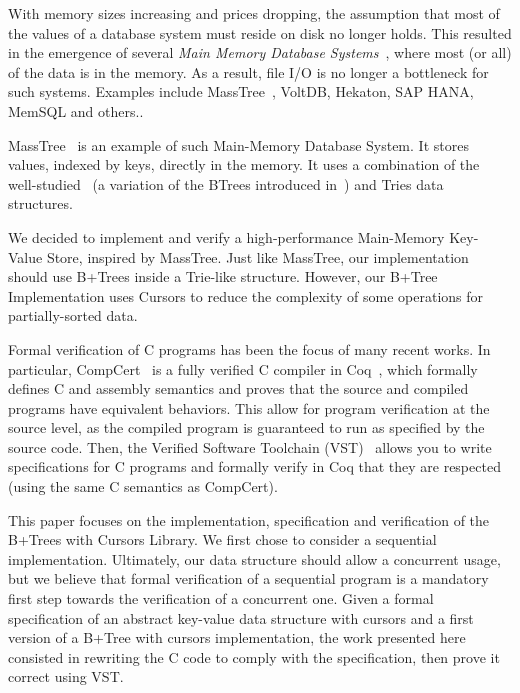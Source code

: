  With memory sizes increasing and prices dropping, the assumption that most of the values of a database system must reside on disk no longer holds.
  This resulted in the emergence of several \textit{Main Memory Database Systems}~\cite{mmdb}, where most (or all) of the data is in the memory.
  As a result, file I/O is no longer a bottleneck for such systems.
  Examples include MassTree~\cite{masstree}, VoltDB, Hekaton, SAP HANA, MemSQL and others..

  MassTree~\cite{masstree} is an example of such Main-Memory Database System.
  It stores values, indexed by keys, directly in the memory.
  It uses a combination of the well-studied \btrees\ (a variation of the BTrees introduced in~\cite{btrees}) and Tries data structures.

  We  decided to implement and verify a high-performance Main-Memory Key-Value Store, inspired by MassTree.
  Just like MassTree, our implementation should use B+Trees inside a Trie-like structure.
  However, our B+Tree Implementation uses Cursors to reduce the complexity of some operations for partially-sorted data.

  Formal verification of C programs has been the focus of many recent works.
  In particular, CompCert~\cite{compcert} is a fully verified C compiler in Coq~\cite{coq}, which formally defines C and assembly semantics and proves that the source and compiled programs have equivalent behaviors.
  This allow for program verification at the source level, as the compiled program is guaranteed to run as specified by the source code.
  Then, the Verified Software Toolchain (VST)~\cite{vst} allows you to write specifications for C programs and formally verify in Coq that they are respected (using the same C semantics as CompCert).

  This paper focuses on the implementation, specification and verification of the B+Trees with Cursors Library. We first chose to consider a sequential implementation.
  Ultimately, our data structure should allow a concurrent usage, but we believe that formal verification of a sequential program is a mandatory first step towards the verification of a concurrent one.
  Given a formal specification of an abstract key-value data structure with cursors and a first version of a B+Tree with cursors implementation, the work presented here consisted in rewriting the C code to comply with the specification, then prove it correct using VST.

